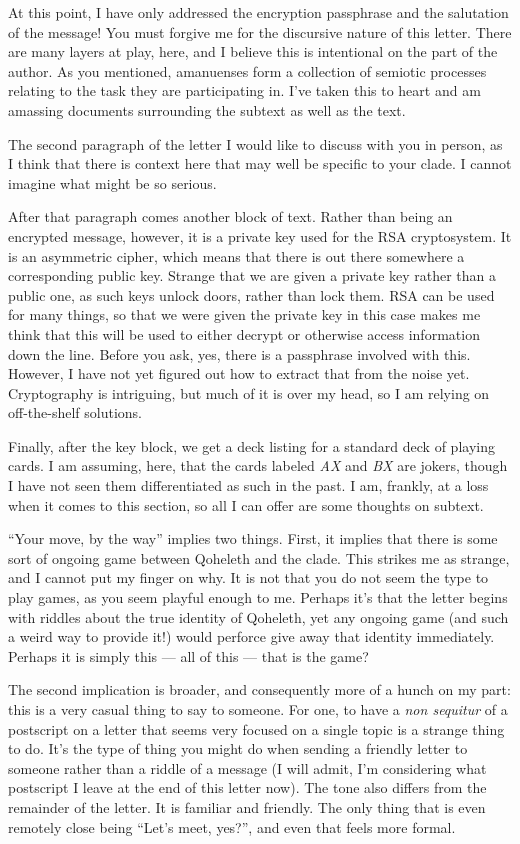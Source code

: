 At this point, I have only addressed the encryption passphrase and the salutation of the message! You must forgive me for the discursive nature of this letter. There are many layers at play, here, and I believe this is intentional on the part of the author. As you mentioned, amanuenses form a collection of semiotic processes relating to the task they are participating in. I've taken this to heart and am amassing documents surrounding the subtext as well as the text.

The second paragraph of the letter I would like to discuss with you in person, as I think that there is context here that may well be specific to your clade. I cannot imagine what might be so serious.

After that paragraph comes another block of text. Rather than being an encrypted message, however, it is a private key used for the RSA cryptosystem. It is an asymmetric cipher, which means that there is out there somewhere a corresponding public key. Strange that we are given a private key rather than a public one, as such keys unlock doors, rather than lock them. RSA can be used for many things, so that we were given the private key in this case makes me think that this will be used to either decrypt or otherwise access information down the line. Before you ask, yes, there is a passphrase involved with this. However, I have not yet figured out how to extract that from the noise yet. Cryptography is intriguing, but much of it is over my head, so I am relying on off-the-shelf solutions.

Finally, after the key block, we get a deck listing for a standard deck of playing cards. I am assuming, here, that the cards labeled \emph{AX} and \emph{BX} are jokers, though I have not seen them differentiated as such in the past. I am, frankly, at a loss when it comes to this section, so all I can offer are some thoughts on subtext.

``Your move, by the way'' implies two things. First, it implies that there is some sort of ongoing game between Qoheleth and the clade. This strikes me as strange, and I cannot put my finger on why. It is not that you do not seem the type to play games, as you seem playful enough to me. Perhaps it's that the letter begins with riddles about the true identity of Qoheleth, yet any ongoing game (and such a weird way to provide it!) would perforce give away that identity immediately. Perhaps it is simply this — all of this — that is the game?

The second implication is broader, and consequently more of a hunch on my part: this is a very casual thing to say to someone. For one, to have a \emph{non sequitur} of a postscript on a letter that seems very focused on a single topic is a strange thing to do. It's the type of thing you might do when sending a friendly letter to someone rather than a riddle of a message (I will admit, I'm considering what postscript I leave at the end of this letter now). The tone also differs from the remainder of the letter. It is familiar and friendly. The only thing that is even remotely close being ``Let's meet, yes?'', and even that feels more formal.

